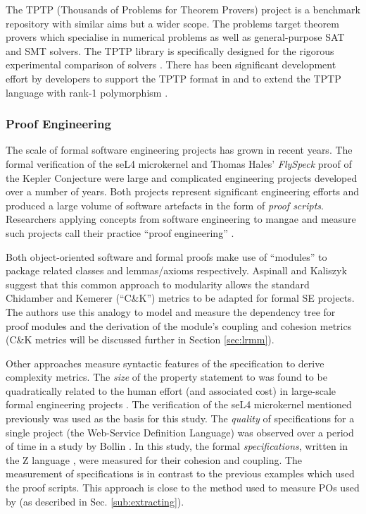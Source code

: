 The TPTP (Thousands of Problems for Theorem Provers) project \cite{TPTP} is a benchmark repository with similar aims but a wider scope. The problems target theorem provers which specialise in numerical problems as well as general-purpose SAT and SMT solvers. The TPTP library is specifically designed for the rigorous experimental comparison of solvers \cite{Sutcliffe200139}. There has been significant development effort by \why developers to support the TPTP format in \why and to extend the TPTP language with rank-1 polymorphism \cite{why:tptp}. 

\subsubsection{Proof Engineering}
\label{sub:lrsvmmpe}

The scale of formal software engineering projects has grown in recent years. The formal verification of the seL4 microkernel \cite{Klein:2014:CFV} and Thomas Hales' \textit{FlySpeck} proof of the Kepler Conjecture \cite{hales-kepler} were large and complicated engineering projects developed over a number of years. Both projects represent significant engineering efforts and produced a large volume of software artefacts in the form of \textit{proof scripts}. Researchers applying concepts from software engineering to mangae and measure such projects call their practice ``proof engineering'' \cite{Klein2014}.

Both object-oriented software and formal proofs make use of ``modules'' to package related classes and lemmas/axioms respectively. Aspinall and Kaliszyk \cite{Aspinall2016} suggest that this common approach to modularity allows the standard Chidamber and Kemerer \cite{CandK} (``C\&K'') metrics to be adapted for formal SE projects. The authors use this analogy to model and measure the dependency tree for proof modules and the derivation of the module's coupling and cohesion metrics (C\&K metrics will be discussed further in Section \ref{sec:lrmm}).

Other approaches measure syntactic features of the specification to derive complexity metrics. The \textit{size} of the property statement to was found to be quadratically related to the human effort (and associated cost) in large-scale formal engineering projects \cite{CostIndicator}. 
The verification of the seL4 microkernel mentioned previously was used as the basis for this study. The \textit{quality} of specifications for a single project (the Web-Service Definition Language) was observed over a period of time in a study by Bollin \cite{Zspecs}. In this study, the formal \textit{specifications}, written in the Z language \cite{Zlang}, were measured for their cohesion and coupling. The measurement of specifications is in contrast to the previous examples \cite{Aspinall2016, CostIndicator} which used the proof scripts. This approach is close to the method used to measure \why POs used by \where (as described in Sec. \ref{sub:extracting}).

